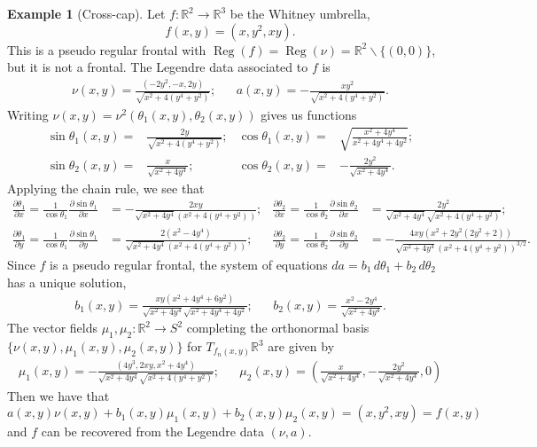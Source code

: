 \documentclass{amsart}
\theoremstyle{definition}
\theoremstyle{definition}
\newtheorem{example}{Example}
\theoremstyle{definition}
\newcommand{\mb}{\mathbb}
\DeclareMathOperator{\Reg}{Reg}
\begin{document}
{\begin{example}[Cross-cap]
Let $f\colon \mb{R}^2 \to \mb{R}^3$ be the Whitney umbrella,
	\[f(x,y)=(x,y^2,xy).\]
This is a pseudo regular frontal with $\Reg(f)=\Reg(\nu)=\mb{R}^2\backslash\{(0,0)\}$, but it is not a frontal.
The Legendre data associated to $f$ is
\begin{align*}
	\nu(x,y)=\frac{(-2 y^2,-x, 2 y)}{\sqrt{x^2+4 \left(y^4+y^2\right)}}; && a(x,y)=-\frac{x y^2}{\sqrt{x^2+4 \left(y^4+y^2\right)}}.
\end{align*}
Writing $\nu(x,y)=\nu^2(\theta_1(x,y),\theta_2(x,y))$ gives us functions
\begin{align*}
	\sin \theta_1(x,y)=&\frac{2 y}{\sqrt{x^2+4 \left(y^4+y^2\right)}}; 	&\cos \theta_1(x,y)=&\sqrt{\frac{x^2+4 y^4}{x^2+4 y^4+4 y^2}};\\
	\sin \theta_2(x,y)=&\frac{x}{\sqrt{x^2+4 y^4}}; 				&\cos \theta_2(x,y)=&-\frac{2 y^2}{\sqrt{x^2+4 y^4}}.
\end{align*}
Applying the chain rule, we see that
\begin{align*}
	\frac{\partial \theta_1}{\partial x}=\frac{1}{\cos \theta_1}\frac{\partial \sin \theta_1}{\partial x}&=-\frac{2 x y}{\sqrt{x^2+4 y^4} \left(x^2+4 \left(y^4+y^2\right)\right)};
	&
	\frac{\partial \theta_2}{\partial x}=\frac{1}{\cos \theta_2}\frac{\partial \sin \theta_2}{\partial x}&=\frac{2 y^2}{\sqrt{x^2+4 y^4} \sqrt{x^2+4 \left(y^4+y^2\right)}};
	\\
	\frac{\partial \theta_1}{\partial y}=\frac{1}{\cos \theta_1}\frac{\partial \sin \theta_1}{\partial y}&=\frac{2 \left(x^2-4 y^4\right)}{\sqrt{x^2+4 y^4} \left(x^2+4 \left(y^4+y^2\right)\right)};&
	\frac{\partial \theta_2}{\partial y}=\frac{1}{\cos \theta_2}\frac{\partial \sin \theta_2}{\partial y}&=-\frac{4 x y \left(x^2+2 y^2 \left(2 y^2+2\right)\right)}{\sqrt{x^2+4 y^4} \left(x^2+4 \left(y^4+y^2\right)\right)^{3/2}}.
\end{align*}
Since $f$ is a pseudo regular frontal, the system of equations $da=b_1\,d\theta_1+b_2\,d\theta_2$ has a unique solution,
\begin{align*}
	b_1(x,y)=\frac{x y \left(x^2+4 y^4+6 y^2\right)}{\sqrt{x^2+4 y^4} \sqrt{x^2+4 y^4+4 y^2}}; && b_2(x,y)=\frac{x^2-2 y^4}{\sqrt{x^2+4 y^4}}.
\end{align*}
The vector fields $\mu_1, \mu_2\colon \mb{R}^2 \to S^2$ completing the orthonormal basis $\{\nu(x,y),\mu_1(x,y),\mu_2(x,y)\}$ for $T_{f_n(x,y)}\mb{R}^3$ are given by
\begin{align*}
	\mu_1(x,y)=-\frac{(4y^3, 2 x y, x^2+4y^4)}{\sqrt{x^2+4 y^4} \sqrt{x^2+4 \left(y^4+y^2\right)}};
		&&
	\mu_2(x,y)=\left(\frac{x}{\sqrt{x^2+4 y^4}},-\frac{2 y^2}{\sqrt{x^2+4 y^4}},0\right)
\end{align*} 
Then we have that
	\[a(x,y)\nu(x,y)+b_1(x,y)\mu_1(x,y)+b_2(x,y)\mu_2(x,y)=(x,y^2,xy)=f(x,y)\]
and $f$ can be recovered from the Legendre data $(\nu,a)$.
\end{example}

}
\end{document}
